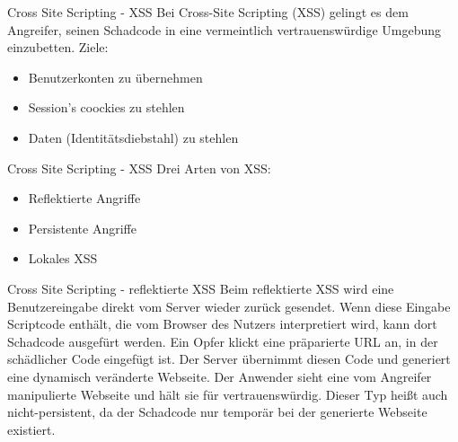 \documentclass[10pt]{beamer}
\begin{document}
\begin{frame}[fragile]{Cross Site Scripting - XSS}
  Bei Cross-Site Scripting (XSS) gelingt es dem Angreifer, seinen Schadcode in eine vermeintlich vertrauensw\"urdige Umgebung einzubetten.
  \newline
  \newline
  Ziele:
  \begin{itemize}
    \item Benutzerkonten zu \"ubernehmen
    \item Session's coockies zu stehlen
    \item Daten (Identit\"atsdiebstahl) zu stehlen
  \end{itemize}
\end{frame}

\begin{frame}[fragile]{Cross Site Scripting - XSS}
  Drei Arten von XSS:
  \begin{itemize}
    \item Reflektierte Angriffe
    \item Persistente Angriffe
    \item Lokales XSS
  \end{itemize}
\end{frame}

\begin{frame}[fragile]{Cross Site Scripting - reflektierte XSS}
  Beim reflektierte XSS wird eine Benutzereingabe direkt vom Server wieder zur\"uck gesendet.
  Wenn diese Eingabe Scriptcode enth\"alt, die vom Browser des Nutzers interpretiert wird, kann dort Schadcode ausgef\"urt werden.
  \newline
  \newline
  Ein Opfer klickt eine pr\"aparierte URL an, in der sch\"adlicher Code eingef\"ugt ist. Der Server \"ubernimmt diesen Code und generiert eine dynamisch ver\"anderte Webseite. Der Anwender sieht eine vom Angreifer manipulierte Webseite und h\"alt sie f\"ur vertrauensw\"urdig.
  \newline
  \newline
  Dieser Typ hei{\ss}t auch nicht-persistent, da der Schadcode nur tempor\"ar bei der generierte Webseite existiert.
\end{frame}
\end{document}
